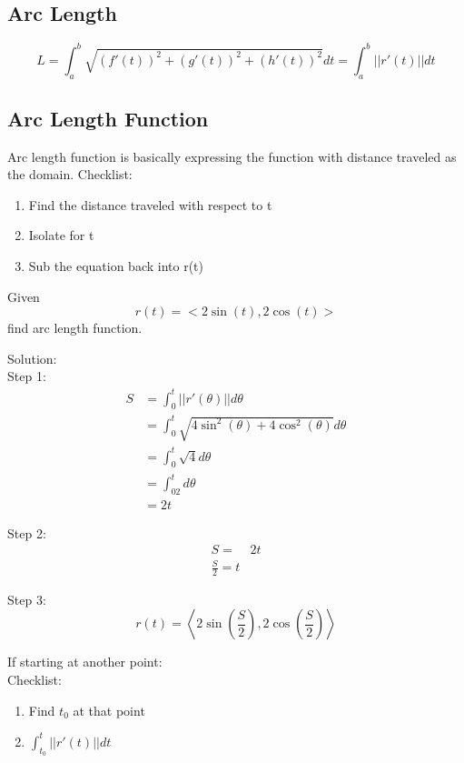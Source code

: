 \subsection{Arc Length}
\begin{equation}
    L=\int^b_a\sqrt{(f'(t))^2+(g'(t))^2+(h'(t))^2}dt=\int^b_a||r'(t)||dt
\end{equation}


\subsection{Arc Length Function}
Arc length function is basically expressing the function with distance traveled as the domain.
\newpage
\noindent Checklist:
\begin{enumerate}
    \item Find the distance traveled with respect to t
    \item Isolate for t
    \item Sub the equation back into r(t)
\end{enumerate}

\begin{simple}{}{}
Given 
$$r(t)=<2\sin{(t)}, 2\cos{(t)}>$$
find arc length function.

Solution:\\
Step 1:
\begin{align*}
    S&=\int^t_0||r'(\theta)||d\theta\\
    &=\int^t_0\sqrt{4\sin^2{(\theta)}+4\cos^2{(\theta)}} d\theta\\
    &=\int^t_0\sqrt{4}d\theta\\
    &=\int^t_02d\theta\\
    &=2t
\end{align*}

Step 2:
\begin{align*}
    S=&2t\\
    \frac{S}{2}=t
\end{align*}

Step 3:
$$r(t)=\left<2\sin{\left(\frac{S}{2}\right)}, 2\cos{\left(\frac{S}{2}\right)}\right>$$
\end{simple}
\noindent If starting at another point:\\
Checklist:
\begin{enumerate}
    \item Find $t_0$ at that point
    \item $\int^t_{t_0}||r'(t)||dt$
\end{enumerate}

